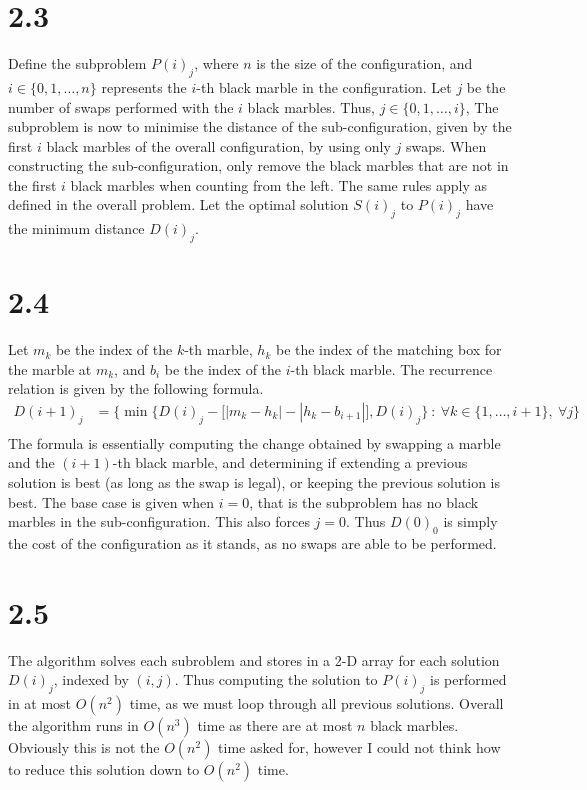 \documentclass[a4paper,11pt]{article}
\newcommand{\ds}{\displaystyle}
\begin{document}
\section{2.3}
Define the subproblem $\ds{P(i)_j}$, where $\ds{n}$ is the size of the configuration, and $\ds{i \in \{0,1,\dots,n\}}$ represents the $\ds{i}$-th black marble in the configuration. Let $\ds{j}$ be the number of swaps performed with the $\ds{i}$ black marbles. Thus, $\ds{j \in \{0,1,\dots,i\}}$, The subproblem is now to minimise the distance of the sub-configuration, given by the first $\ds{i}$ black marbles of the overall configuration, by using only $\ds{j}$ swaps. When constructing the sub-configuration, only remove the black marbles that are not in the first $\ds{i}$ black marbles when counting from the left. The same rules apply as defined in the overall problem. Let the optimal solution $\ds{S(i)_j}$ to $\ds{P(i)_j}$ have the minimum distance $\ds{D(i)_j}$.

\section{2.4}
Let $\ds{m_k}$ be the index of the $\ds{k}$-th marble, $\ds{h_k}$ be the index of the matching box for the marble at $\ds{m_k}$, and $\ds{b_i}$ be the index of the $\ds{i}$-th black marble. The recurrence relation is given by the following formula.
\begin{align*}
	D(i+1)_j & = \{\min\{D(i)_j - \Big[|m_k-h_k|-|h_k-b_{i+1}|\Big], D(i)_j\} \: :\: \forall k\in \{1,\dots,i+1\}, \: \forall j\}\\
\end{align*}
The formula is essentially computing the change obtained by swapping a marble and the $\ds{(i+1)}$-th black marble, and determining if extending a previous solution is best (as long as the swap is legal), or keeping the previous solution is best.
\bigbreak
\noindent The base case is given when $\ds{i = 0}$, that is the subproblem has no black marbles in the sub-configuration. This also forces $\ds{j = 0}$. Thus $\ds{D(0)_0}$ is simply the cost of the configuration as it stands, as no swaps are able to be performed.

\pagebreak

\section{2.5}
The algorithm solves each subroblem and stores in a 2-D array for each solution $\ds{D(i)_j}$, indexed by $\ds{(i,j)}$. Thus computing the solution to $\ds{P(i)_j}$ is performed in at most $\ds{O(n^2)}$ time, as we must loop through all previous solutions. Overall the algorithm runs in $\ds{O(n^3)}$ time as there are at most $\ds{n}$ black marbles. Obviously this is not the $\ds{O(n^2)}$ time asked for, however I could not think how to reduce this solution down to $\ds{O(n^2)}$ time.
\end{document}
